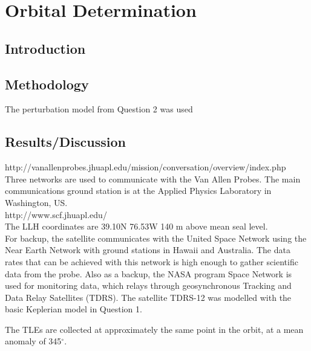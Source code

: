 \documentclass[Space3_Assign1.tex]{subfiles}
\begin{document}
\newpage
\section{Orbital Determination}

\subsection{Introduction}

\subsection{Methodology}
The perturbation model from Question 2 was used
\subsection{Results/Discussion}
http://vanallenprobes.jhuapl.edu/mission/conversation/overview/index.php\\
Three networks are used to communicate with the Van Allen Probes. The main communications ground station is at the Applied Physics Laboratory in Washington, US.\\
http://www.scf.jhuapl.edu/\\
The LLH coordinates are 39.10N 76.53W 140 m above mean seal level. \\
For backup, the satellite communicates with the United Space Network using the Near Earth Network with ground stations in Hawaii and Australia. The data rates that can be achieved with this network is high enough to gather scientific data from the probe. Also as a backup, the NASA program Space Network is used for monitoring data, which relays through geosynchronous Tracking and Data Relay Satellites (TDRS). The satellite TDRS-12 was modelled with the basic Keplerian model in Question 1.

The TLEs are collected at approximately the same point in the orbit, at a mean anomaly of 345$^{\circ}$.
\end{document}
